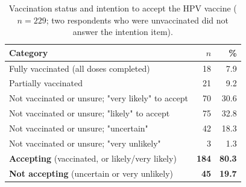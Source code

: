 \begin{table}[htbp]\centering\small
\caption{Vaccination status and intention to accept the HPV vaccine ($n=229$; two respondents who were unvaccinated did not answer the intention item).}\label{tab:acceptance}
\begin{tabularx}{\textwidth}{@{}>{\raggedright\arraybackslash}X rr@{}}\toprule
Category & $n$ & \% \\\midrule
Fully vaccinated (all doses completed) & 18 & 7.9 \\
Partially vaccinated & 21 & 9.2 \\
\midrule
Not vaccinated or unsure; "very likely" to accept & 70 & 30.6 \\
Not vaccinated or unsure; "likely" to accept & 75 & 32.8 \\
Not vaccinated or unsure; "uncertain" & 42 & 18.3 \\
Not vaccinated or unsure; "very unlikely" & 3 & 1.3 \\
\midrule
\textbf{Accepting} (vaccinated, or likely/very likely) & \textbf{184} & \textbf{80.3} \\
\textbf{Not accepting} (uncertain or very unlikely) & \textbf{45} & \textbf{19.7} \\
\bottomrule\end{tabularx}\end{table}
